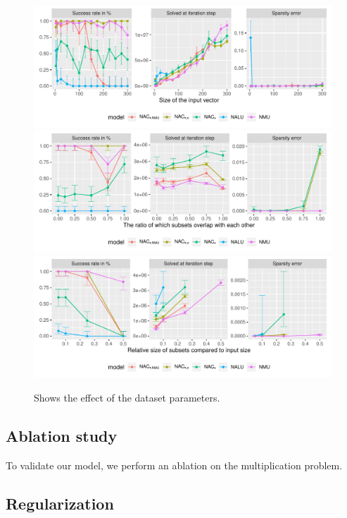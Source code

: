 \begin{figure}[h]
\centering
\includegraphics[width=\linewidth,trim={0 1.3cm 0 0},clip]{results/simple_function_static_mul_input_size.pdf}
\includegraphics[width=\linewidth,trim={0 1.3cm 0 0.809cm},clip]{results/simple_function_static_mul_overlap.pdf}
\includegraphics[width=\linewidth,trim={0 0 0 0.809cm},clip]{results/simple_function_static_mul_subset.pdf}
\caption{Shows the effect of the dataset parameters.}
\label{fig:simple-function-static-dataset-parameters-boundary}
\end{figure}

\subsection{Ablation study}
\label{sec:appendix:ablation-study}
To validate our model, we perform an ablation on the multiplication problem.


\subsection{Regularization}
\label{sec:appendix:simple-function-task:regualization}

